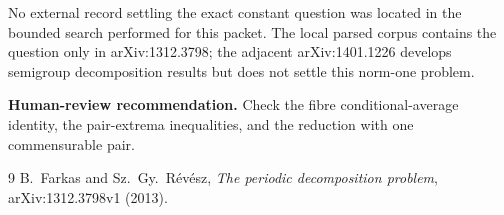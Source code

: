 \documentclass[11pt]{article}
\begin{document}
No external record settling the exact constant question was located in the
bounded search performed for this packet.  The local parsed corpus contains
the question only in arXiv:1312.3798; the adjacent arXiv:1401.1226 develops
semigroup decomposition results but does not settle this norm-one problem.

\textbf{Human-review recommendation.} Check the fibre conditional-average
identity, the pair-extrema inequalities, and the reduction with one
commensurable pair.

\begin{thebibliography}{9}
B.~Farkas and Sz.~Gy.~R\'ev\'esz,
\emph{The periodic decomposition problem}, arXiv:1312.3798v1 (2013).
\end{thebibliography}
\end{document}
